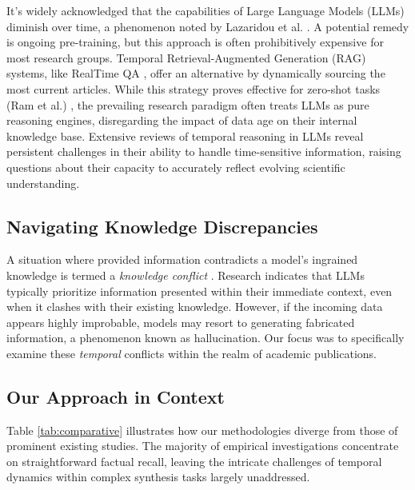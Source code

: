 \documentclass[acmsmall,screen,nonacm]{acmart}
\begin{document}
It's widely acknowledged that the capabilities of Large Language Models (LLMs) diminish over time, a phenomenon noted by Lazaridou et al. \cite{lazaridou2021mind}. A potential remedy is ongoing pre-training, but this approach is often prohibitively expensive for most research groups. Temporal Retrieval-Augmented Generation (RAG) systems, like RealTime QA \cite{kasai2024realtime}, offer an alternative by dynamically sourcing the most current articles. While this strategy proves effective for zero-shot tasks (Ram et al.) \cite{ram2023context}, the prevailing research paradigm often treats LLMs as pure reasoning engines, disregarding the impact of data age on their internal knowledge base. Extensive reviews of temporal reasoning in LLMs \cite{jin2024comprehensive} reveal persistent challenges in their ability to handle time-sensitive information, raising questions about their capacity to accurately reflect evolving scientific understanding.

\subsection{Navigating Knowledge Discrepancies} \label{subsec:knowledge_conflicts}

A situation where provided information contradicts a model's ingrained knowledge is termed a \textit{knowledge conflict} \cite{wang2023knowledge}. Research indicates that LLMs typically prioritize information presented within their immediate context, even when it clashes with their existing knowledge. However, if the incoming data appears highly improbable, models may resort to generating fabricated information, a phenomenon known as hallucination. Our focus was to specifically examine these \textit{temporal} conflicts within the realm of academic publications.

\subsection{Our Approach in Context} \label{subsec:comparative_analysis}

Table \ref{tab:comparative} illustrates how our methodologies diverge from those of prominent existing studies. The majority of empirical investigations concentrate on straightforward factual recall, leaving the intricate challenges of temporal dynamics within complex synthesis tasks largely unaddressed.
\end{document}
